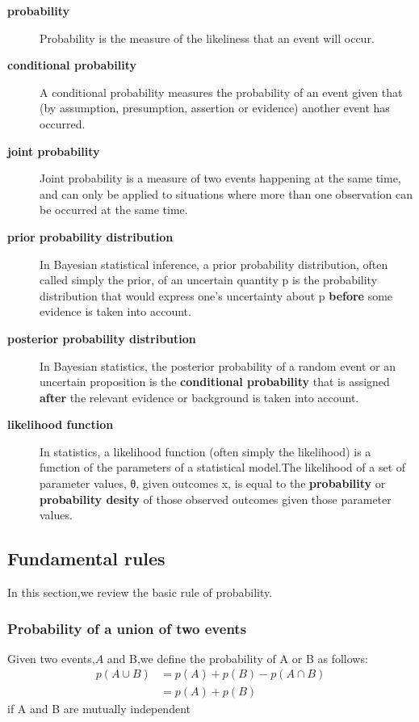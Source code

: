 \begin{description}
\item[\textbf{probability}] Probability is the measure of the likeliness that an event will occur.
\item[\textbf{conditional probability}] A conditional probability measures the probability of an event given that (by assumption, presumption, assertion or evidence) another event has occurred.
\item[\textbf{joint probability}] Joint probability is a measure of two events happening at the same time, and can only be applied to situations where more than one observation can be occurred at the same time.
\item[\textbf{prior probability distribution}]
In Bayesian statistical inference, a prior probability distribution, often called simply the prior, of an uncertain quantity p is the probability distribution that would express one's uncertainty about p \textbf{before} some evidence is taken into account.

\item[\textbf{posterior probability distribution}]
In Bayesian statistics, the posterior probability of a random event or an uncertain proposition is the \textbf{conditional probability} that is assigned \textbf{after} the relevant evidence or background is taken into account.

\item[\textbf{likelihood function}]
In statistics, a likelihood function (often simply the likelihood) is a function of the parameters of a statistical model.The likelihood of a set of parameter values, θ, given outcomes x, is equal to the \textbf{probability}  or \textbf{probability desity} of those observed outcomes given those parameter values.
\end{description}

\subsection{Fundamental rules}
In this section,we review the basic rule of probability.
\subsubsection{Probability of a union of two events}
Given two events,$A$ and B,we define the probability of A or B as follows:
\begin{align}
p(A\cup B)& = p(A) + p(B) - p(A\cap B)	\\
		  & = p(A) + p(B)
\end{align}
if A and B are mutually independent 


